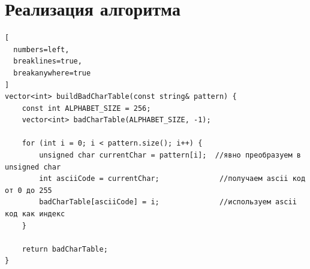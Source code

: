 \documentclass[otchet]{SCWorks}
\begin{document}

\date{2026}

\maketitle

\secNumbering

\tableofcontents




\section{Реализация алгоритма}
\begin{Verbatim}[
  numbers=left,
  breaklines=true,
  breakanywhere=true
]
vector<int> buildBadCharTable(const string& pattern) {
    const int ALPHABET_SIZE = 256;
    vector<int> badCharTable(ALPHABET_SIZE, -1);

    for (int i = 0; i < pattern.size(); i++) {
        unsigned char currentChar = pattern[i];  //явно преобразуем в unsigned char
        int asciiCode = currentChar;              //получаем ascii код от 0 до 255
        badCharTable[asciiCode] = i;              //используем ascii код как индекс
    }

    return badCharTable;
}
\end{Verbatim}
\end{document}
